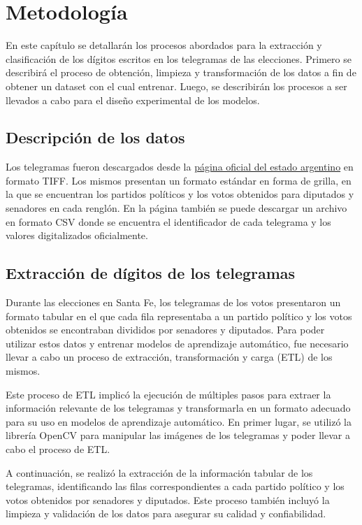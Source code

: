 \chapter{Metodología}

\label{Chapter3}

En este capítulo se detallarán los procesos abordados para la extracción y clasificación de los dígitos escritos en los
telegramas de las elecciones. Primero se describirá el proceso de obtención, limpieza y transformación de los datos a
fin de obtener un dataset con el cual entrenar. Luego, se describirán los procesos a ser llevados a cabo para el diseño
experimental de los modelos.

\section{Descripción de los datos}

Los telegramas fueron descargados desde la \href{https://op.elecciones.gob.ar/telegramas/generales2021/}{página oficial
    del estado argentino} en formato TIFF. Los mismos presentan un formato estándar en forma de grilla, en la que se
encuentran los partidos políticos y los votos obtenidos para diputados y senadores en cada renglón. En la página
también se puede descargar un archivo en formato CSV donde se encuentra el identificador de cada telegrama y los
valores digitalizados oficialmente.

\section{Extracción de dígitos de los telegramas}

Durante las elecciones en Santa Fe, los telegramas de los votos presentaron un formato tabular en el que cada fila
representaba a un partido político y los votos obtenidos se encontraban divididos por senadores y diputados. Para poder
utilizar estos datos y entrenar modelos de aprendizaje automático, fue necesario llevar a cabo un proceso de
extracción, transformación y carga (ETL) de los mismos.

Este proceso de ETL implicó la ejecución de múltiples pasos para extraer la información relevante de los telegramas y
transformarla en un formato adecuado para su uso en modelos de aprendizaje automático. En primer lugar, se utilizó la
librería OpenCV \parencite{opencv_library} para manipular las imágenes de los telegramas y poder llevar a cabo el proceso de ETL.

A continuación, se realizó la extracción de la información tabular de los telegramas, identificando las filas
correspondientes a cada partido político y los votos obtenidos por senadores y diputados. Este proceso también incluyó
la limpieza y validación de los datos para asegurar su calidad y confiabilidad.


